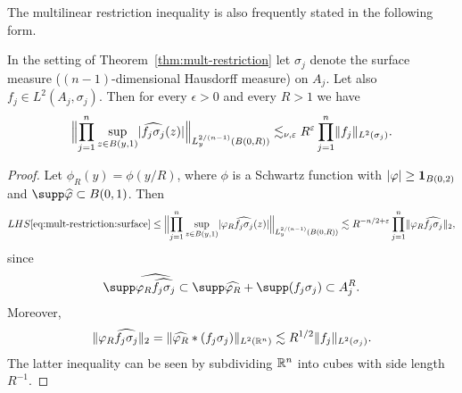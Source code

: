 The multilinear restriction inequality is also frequently stated in the following form.
\begin{corollary}
In the setting of Theorem~\ref{thm:mult-restriction} let $\sigma_{j}$ denote the surface measure ($(n-1)$-dimensional Hausdorff measure) on $A_{j}$.
Let also $f_{j} \in L^{2}(A_{j},\sigma_{j})$.
Then for every $\epsilon>0$ and every $R>1$ we have
\begin{equation}
\label{eq:mult-restriction:surface}
\norm[\Big]{\prod_{j=1}^{n} \sup_{z \in B(y,1)}\abs{\widehat{f_{j}\sigma_{j}}(z)}}_{L^{2/(n-1)}_{y}(B(0,R))}
\lesssim_{\nu,\epsilon}
R^{\epsilon} \prod_{j=1}^{n}\norm{f_{j}}_{L^{2}(\sigma_{j})}.
\end{equation}
\end{corollary}
\begin{proof}
Let $\phi_{R}(y) = \phi(y/R)$, where $\phi$ is a Schwartz function with $\abs{\phi} \geq \one_{B(0,2)}$ and $\supp \widehat{\phi} \subset B(0,1)$.
Then
\[
LHS\eqref{eq:mult-restriction:surface}
\leq
\norm[\Big]{\prod_{j=1}^{n} \sup_{z \in B(y,1)}\abs{\phi_{R}\widehat{f_{j}\sigma_{j}}(z)}}_{L^{2/(n-1)}_{y}(B(0,R))}
\lesssim
R^{-n/2+\epsilon} \prod_{j=1}^{n}\norm{\phi_{R}\widehat{f_{j}\sigma_{j}}}_{2},
\]
since
\[
\supp \widehat{\phi_{R}\widehat{f_{j}\sigma_{j}}}
\subset
\supp \widehat{\phi_{R}} + \supp (f_{j}\sigma_{j})
\subset
A_{j}^{R}.
\]
Moreover,
\[
\norm{\phi_{R}\widehat{f_{j}\sigma_{j}}}_{2}
=
\norm{\widehat{\phi_{R}}*(f_{j}\sigma_{j})}_{L^{2}(\R^{n})}
\lesssim
R^{1/2} \norm{f_{j}}_{L^{2}(\sigma_{j})}.
\]
The latter inequality can be seen by subdividing $\R^{n}$ into cubes with side length $R^{-1}$.
\end{proof}
